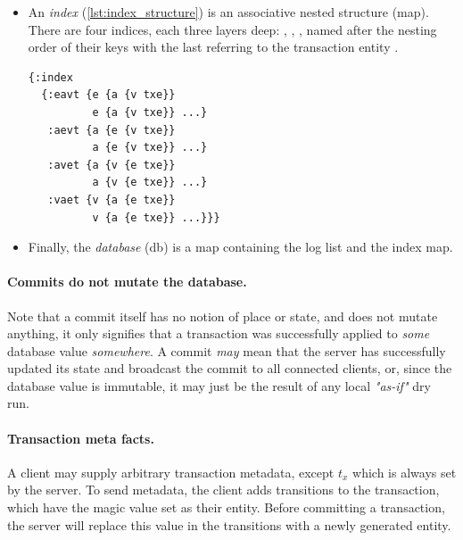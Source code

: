 \begin{itemize}
\begin{center}
\end{center}

\item An \emph{index} (\autoref{lst:index_structure}) is an associative nested structure (map). There are four indices, each three layers deep: , , , named after the nesting order of their keys with the last  referring to the transaction entity .

\begin{lstlisting}[label={lst:index_structure},morekeywords={:+,:-,txe},caption=Structure of the indices]
{:index
  {:eavt {e {a {v txe}}
          e {a {v txe}} ...}
   :aevt {a {e {v txe}}
          a {e {v txe}} ...}
   :avet {a {v {e txe}}
          a {v {e txe}} ...}
   :vaet {v {a {e txe}}
          v {a {e txe}} ...}}}
\end{lstlisting}

\item Finally, the \emph{database} (db) is a map containing the log list and the index map.

\begin{center}
\end{center}

\end{itemize}

\paragraph{Commits do not mutate the database.}
Note that a commit itself has no notion of place or state, and does not mutate anything, it only signifies that a transaction was successfully applied to \emph{some} database value \emph{somewhere}. A commit \emph{may} mean that the server has successfully updated its state and broadcast the commit to all connected clients, or, since the database value is immutable, it may just be the result of any local \emph{"as-if"} dry run.

\paragraph{Transaction meta facts.}
A client may supply arbitrary transaction metadata, except $t_x$ which is always set by the server. To send metadata, the client adds transitions to the transaction, which have the magic value  set as their entity. Before committing a transaction, the server will replace this value in the transitions with a newly generated entity.



